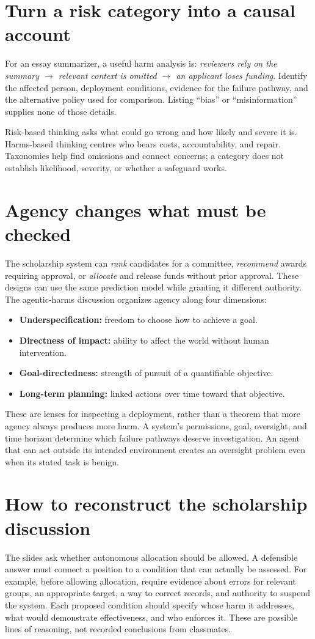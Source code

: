 \documentclass[11pt,letterpaper]{article}
\begin{document}
\section*{Turn a risk category into a causal account}
For an essay summarizer, a useful harm analysis is:
\emph{reviewers rely on the summary $\to$ relevant context is omitted $\to$ an
applicant loses funding}. Identify the affected person, deployment conditions,
evidence for the failure pathway, and the alternative policy used for comparison.
Listing ``bias'' or ``misinformation'' supplies none of those details.

Risk-based thinking asks what could go wrong and how likely and severe it is.
Harms-based thinking centres who bears costs, accountability, and repair.
Taxonomies help find omissions and connect concerns; a category does not establish
likelihood, severity, or whether a safeguard works.

\newpage
\section*{Agency changes what must be checked}
The scholarship system can \emph{rank} candidates for a committee,
\emph{recommend} awards requiring approval, or \emph{allocate} and release funds
without prior approval. These designs can use the same prediction model while
granting it different authority. The agentic-harms discussion organizes agency
along four dimensions:

\begin{itemize}
\item \textbf{Underspecification:} freedom to choose how to achieve a goal.
\item \textbf{Directness of impact:} ability to affect the world without human intervention.
\item \textbf{Goal-directedness:} strength of pursuit of a quantifiable objective.
\item \textbf{Long-term planning:} linked actions over time toward that objective.
\end{itemize}

These are lenses for inspecting a deployment, rather than a theorem that more
agency always produces more harm. A system's permissions, goal, oversight, and
time horizon determine which failure pathways deserve investigation. An agent
that can act outside its intended environment creates an oversight problem even
when its stated task is benign.

\section*{How to reconstruct the scholarship discussion}
The slides ask whether autonomous allocation should be allowed. A defensible
answer must connect a position to a condition that can actually be assessed.
For example, before allowing allocation, require evidence about errors for relevant
groups, an appropriate target, a way to correct records, and authority to suspend
the system. Each proposed condition should specify whose harm it addresses, what
would demonstrate effectiveness, and who enforces it. These are possible lines
of reasoning, not recorded conclusions from classmates.
\end{document}
